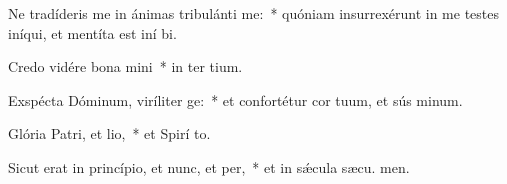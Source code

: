 \item Ne tradíderis me in ánimas tribulánti me:~* quóniam insurrexérunt in me testes iníqui, et mentíta est iní bi.
\item Credo vidére bona mini~* in ter tium.
\item Exspécta Dóminum, viríliter ge:~* et confortétur cor tuum, et sús minum.
\item Glória Patri, et lio,~* et Spirí to.
\item Sicut erat in princípio, et nunc, et per,~* et in sǽcula sæcu. men.

